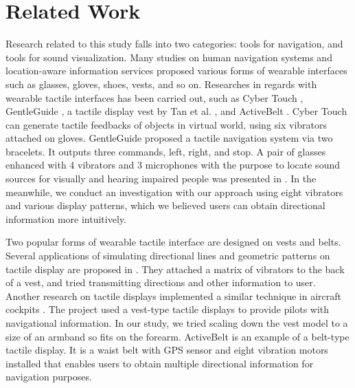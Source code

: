 \documentclass{sigchi}
\begin{document}
\section{Related Work}
Research related to this study falls into two categories: tools for navigation, and tools for sound visualization. Many studies on human navigation systems and location-aware information services proposed various forms of wearable interfaces such as glasses, gloves, shoes, vests, and so on. Researches in regards with wearable tactile interfaces has been carried out, such as Cyber Touch \cite{CyberGlove}, GentleGuide \cite{Bosman2003}, a tactile display vest by Tan et al. \cite{Tan1997}, and ActiveBelt \cite{Tsukada2004}. Cyber Touch can generate tactile feedbacks of objects in virtual world, using six vibrators attached on gloves. GentleGuide proposed a tactile navigation system via two bracelets. It outputs three commands, left, right, and stop. A pair of glasses enhanced with 4 vibrators and 3 microphones with the purpose to locate sound sources for visually and hearing impaired people was presented in \cite{Borg}. In the meanwhile, we conduct an investigation with our approach using eight vibrators and various display patterns, which we believed users can obtain directional information more intuitively.
 
Two popular forms of wearable tactile interface are designed on vests and belts. Several applications of simulating directional lines and geometric patterns on tactile display are proposed in \cite{Tan1997}. They attached a matrix of vibrators to the back of a vest, and tried transmitting directions and other information to user. Another research on tactile displays implemented a similar technique in aircraft cockpits \cite{Raj2000}. The project used a vest-type tactile displays to provide pilots with navigational information. In our study, we tried scaling down the vest model to a size of an armband so fits on the forearm. ActiveBelt is an example of a belt-type tactile display. It is a waist belt with GPS sensor and eight vibration motors installed that enables users to obtain multiple directional information for navigation purposes.
\end{document}

